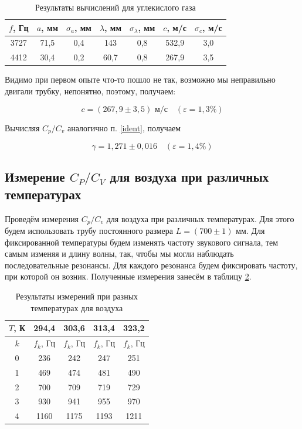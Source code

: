 \documentclass[a4paper,12pt]{article}
\theoremstyle{definition}
\begin{document}
	\begin{table}[H]
		\centering
		\begin{tabular}{|c|c|c|c|c|c|c|}
			\hline
			$ f $, Гц & $ a $, мм & $ \sigma_a $, мм & $ \lambda $, мм & $ \sigma_\lambda $, мм & $ c $, м/с & $ \sigma_c $, м/с \\ \hline
			3727 & 71,5 & 0,4 & 143 & 0,8 & 532,9 & 3,0 \\ \hline
			4412 & 30,4 & 0,2 & 60,7 & 0,8 & 267,9 & 3,5 \\ \hline
		\end{tabular}
		\caption{Результаты вычислений для углекислого газа}
		\label{tab:resCO2}
	\end{table}

	
	Видимо при первом опыте что-то пошло не так, возможно мы неправильно двигали трубку, непонятно, поэтому, получаем:
	
	\[ \boxed{c=(267,9 \pm 3,5)  \text{ м/с}} \quad (\varepsilon=1,3\%)\]
	
	Вычисляя $ C_p/C_v $ аналогично п. \ref{ident}, получаем
	
	\[ \boxed{\gamma = 1,271 \pm 0,016}\quad (\varepsilon=1,4\%) \]
	
	\subsection{Измерение $ C_P/C_V $ для воздуха при различных температурах}
	
	Проведём измерения $ C_p/C_v $ для воздуха при различных температурах. Для этого будем использовать трубу постоянного размера $ L = (700 \pm 1) $ мм. Для фиксированной температуры будем изменять частоту звукового сигнала, тем самым изменяя и длину волны, так, чтобы мы могли наблюдать последовательные резонансы. Для каждого резонанса будем фиксировать частоту, при которой он возник. Полученные измерения занесём в таблицу \ref{tab:constL}.
	
	\begin{table}[H]
		\centering
		\begin{tabular}{|c|c|c|c|c|}
			\hline
			$ T $, К & 294,4 & 303,6 & 313,4 & 323,2  \\ \hline
			$k$ &  $ f_k $, Гц & $ f_k $, Гц &  $ f_k $, Гц & $ f_k $, Гц \\ \hline
			0 & 236 &242 & 247& 251 \\ \hline
			1 & 469 &474 & 481 &490\\ \hline
			2 & 700 & 709 & 719&729 \\ \hline
			3 & 930 & 941 & 955 &970 \\ \hline
			4 & 1160 & 1175& 1193 &1211 \\ \hline
		\end{tabular}
		\caption{Результаты измерений при разных температурах для воздуха}
		\label{tab:constL}
	\end{table}
	
\end{document}
